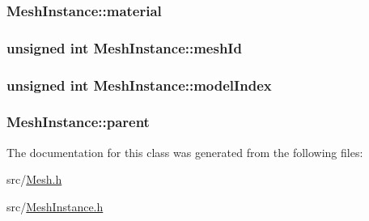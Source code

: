 \subsubsection[{\texorpdfstring{material}{material}}]{ Mesh\+Instance\+::material}\hypertarget{class_mesh_instance_adba237cd83810b3afa89f1b911997e17}{}\label{class_mesh_instance_adba237cd83810b3afa89f1b911997e17}
\subsubsection[{\texorpdfstring{mesh\+Id}{meshId}}]{\setlength{\rightskip}{0pt plus 5cm}unsigned int Mesh\+Instance\+::mesh\+Id}\hypertarget{class_mesh_instance_aec954bfbb05fd9d2e4da020ca61b8c35}{}\label{class_mesh_instance_aec954bfbb05fd9d2e4da020ca61b8c35}
\subsubsection[{\texorpdfstring{model\+Index}{modelIndex}}]{\setlength{\rightskip}{0pt plus 5cm}unsigned int Mesh\+Instance\+::model\+Index}\hypertarget{class_mesh_instance_a969bc28f038cda422be9efe24c308b58}{}\label{class_mesh_instance_a969bc28f038cda422be9efe24c308b58}
\subsubsection[{\texorpdfstring{parent}{parent}}]{ Mesh\+Instance\+::parent\hspace{0.3cm}{\ttfamily [protected]}}\hypertarget{class_mesh_instance_ad248a44f589cbeb5a8ec8748afebdcd8}{}\label{class_mesh_instance_ad248a44f589cbeb5a8ec8748afebdcd8}


The documentation for this class was generated from the following files\+:\begin{DoxyCompactItemize}
\item 
src/\hyperlink{_mesh_8h}{Mesh.\+h}\item 
src/\hyperlink{_mesh_instance_8h}{Mesh\+Instance.\+h}\end{DoxyCompactItemize}
